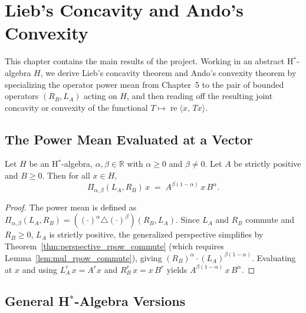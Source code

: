 \chapter{Lieb's Concavity and Ando's Convexity}

This chapter contains the main results of the project.
Working in an abstract H$^*$-algebra $H$, we derive Lieb's concavity theorem and
Ando's convexity theorem by specializing the operator power mean from
Chapter~5 to the pair of bounded operators $(R_B, L_A)$ acting on $H$,
and then reading off the resulting joint concavity or convexity of the
functional $T \mapsto \operatorname{re}\langle x,\, T x\rangle$.

\section{The Power Mean Evaluated at a Vector}

\begin{proposition}
  \label{prop:powermean_apply}
  \leanok
  Let $H$ be an H$^*$-algebra, $\alpha, \beta \in \mathbb{R}$ with $\alpha \geq 0$ and
  $\beta \neq 0$.  Let $A$ be strictly positive and $B \geq 0$.  Then for all $x \in H$,
  \[
    \Pi_{\alpha,\beta}(L_A, R_B)\,x \;=\; A^{\beta(1-\alpha)}\, x\, B^\alpha.
  \]
  \begin{proof}
    \leanok
    The power mean is defined as $\Pi_{\alpha,\beta}(L_A, R_B) =
    ((\cdot)^\alpha \triangle (\cdot)^\beta)(R_B, L_A)$.
    Since $L_A$ and $R_B$ commute and $R_B \geq 0$, $L_A$ is strictly positive,
    the generalized perspective simplifies by Theorem~\ref{thm:perspective_rpow_commute}
    (which requires Lemma~\ref{lem:mul_rpow_commute}), giving
    $(R_B)^\alpha \cdot (L_A)^{\beta(1-\alpha)}$.
    Evaluating at $x$ and using $L_A^r\,x = A^r x$ and $R_B^r\,x = x\,B^r$
    yields $A^{\beta(1-\alpha)}\,x\,B^\alpha$.
  \end{proof}
\end{proposition}

\section{General H\texorpdfstring{$^*$}{*}-Algebra Versions}

